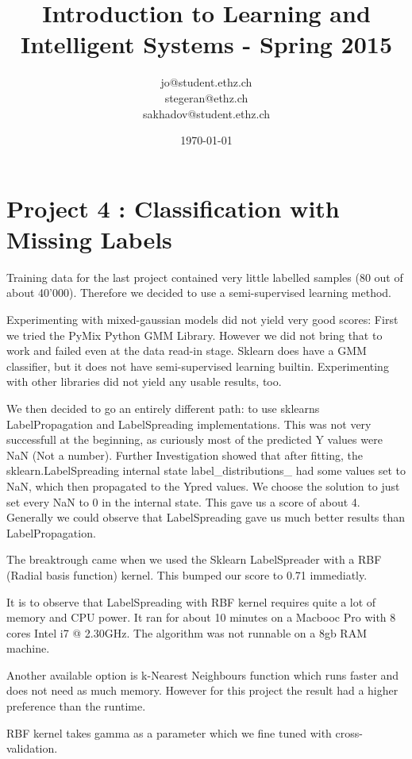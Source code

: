 \documentclass[a4paper, 11pt]{article}
\title{Introduction to Learning and Intelligent Systems - Spring 2015}
\author{jo@student.ethz.ch\\ stegeran@ethz.ch\\sakhadov@student.ethz.ch}
\date{\today}
\begin{document}
\maketitle

\section*{Project 4 : Classification with Missing Labels}

Training data for the last project contained very little labelled samples (80 out of about 40'000). Therefore we decided to use a semi-supervised learning method.

Experimenting with mixed-gaussian models did not yield very good scores: First we tried the PyMix Python GMM Library. However we did not bring that to work and failed even at the data read-in stage. Sklearn does have a GMM classifier, but it does not have semi-supervised learning builtin. Experimenting with other libraries did not yield any usable results, too.

We then decided to go an entirely different path: to use sklearns LabelPropagation and LabelSpreading implementations. This was not very successfull at the beginning, as curiously most of the predicted Y values were NaN (Not a number). Further Investigation showed that after fitting, the sklearn.LabelSpreading internal state label_distributions_ had some values set to NaN, which then propagated to the Ypred values. We choose the solution to just set every NaN to 0 in the internal state. This gave us a score of about 4. Generally we could observe that LabelSpreading gave us much better results than LabelPropagation.

The breaktrough came when we used the Sklearn LabelSpreader with a RBF (Radial basis function) kernel. This bumped our score to 0.71 immediatly.

It is to observe that LabelSpreading with RBF kernel requires quite a lot of memory and CPU power. It ran for about 10 minutes on a Macbooc Pro with 8 cores Intel i7 @ 2.30GHz. The algorithm was not runnable on a 8gb RAM machine.

Another available option is k-Nearest Neighbours function which runs faster and does not need as much memory. However for this project the result had a higher preference than the runtime.

RBF kernel takes gamma as a parameter which we fine tuned with cross-validation.
\end{document}
